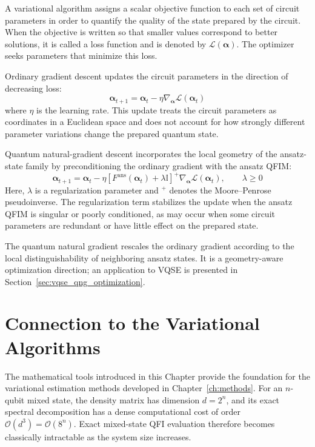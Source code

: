 \begin{remark}
    A variational algorithm assigns a scalar objective function to each set of circuit parameters in order to quantify the quality of the state prepared by the circuit. When the objective is written so that smaller values correspond to better solutions, it is called a loss function and is denoted by $\mathcal{L}(\boldsymbol{\alpha})$. The optimizer seeks parameters that minimize this loss.

    Ordinary gradient descent updates the circuit parameters in the direction of decreasing loss:
    \begin{equation}
        \boldsymbol{\alpha}_{t+1}
        =
        \boldsymbol{\alpha}_t
        -
        \eta
        \nabla_{\boldsymbol{\alpha}}
        \mathcal{L}(\boldsymbol{\alpha}_t)
    \end{equation}
    where $\eta$ is the learning rate. This update treats the circuit parameters as coordinates in a Euclidean space and does not account for how strongly different parameter variations change the prepared quantum state.

    Quantum natural-gradient descent incorporates the local geometry of the ansatz-state family by preconditioning the ordinary gradient with the ansatz QFIM:
    \begin{equation}
        \boldsymbol{\alpha}_{t+1}
        =
        \boldsymbol{\alpha}_t
        -
        \eta
        \left[
            F^{\mathrm{ans}}(\boldsymbol{\alpha}_t)
            +
            \lambda\mathbb{I}
            \right]^{+}
        \nabla_{\boldsymbol{\alpha}}
        \mathcal{L}(\boldsymbol{\alpha}_t),
        \qquad
        \lambda\geq0
        \label{eq:qng_update}
    \end{equation}
    Here, $\lambda$ is a regularization parameter and ${}^{+}$ denotes the Moore--Penrose pseudoinverse. The regularization term stabilizes the update when the ansatz QFIM is singular or poorly conditioned, as may occur when some circuit parameters are redundant or have little effect on the prepared state.

    The quantum natural gradient rescales the ordinary gradient according to the local distinguishability of neighboring ansatz states. It is a geometry-aware optimization direction; an application to VQSE is presented in Section~\ref{sec:vqse_qng_optimization}.
\end{remark}

\section{Connection to the Variational Algorithms}
The mathematical tools introduced in this Chapter provide the foundation for the variational estimation methods developed in Chapter~\ref{ch:methods}.
For an $n$-qubit mixed state, the density matrix has dimension $d=2^n$, and its exact spectral decomposition has a dense computational cost of order $\mathcal{O}(d^3)=\mathcal{O}(8^n)$. Exact mixed-state QFI evaluation therefore becomes classically intractable as the system size increases.


